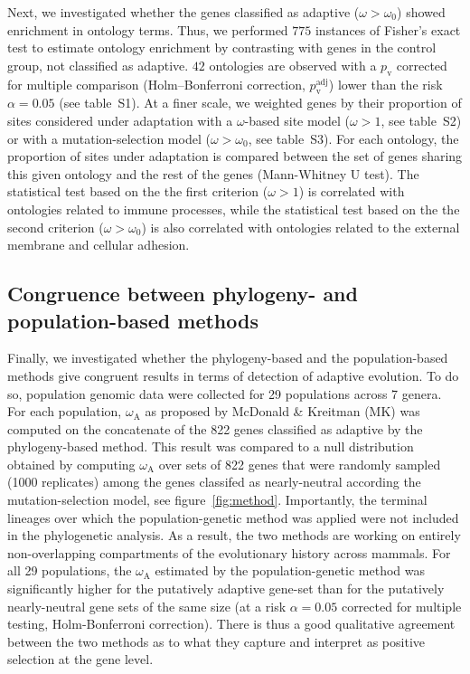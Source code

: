 \documentclass{article}
\newcommand{\rateApop}{\omega_{\mathrm{A}}}
\begin{document}
    Next, we investigated whether the genes classified as adaptive ($\omega > \omega_{0}$) showed enrichment in ontology terms.
    Thus, we performed $775$ instances of Fisher's exact test to estimate ontology enrichment by contrasting with genes in the control group, not classified as adaptive.
    $42$ ontologies are observed with a $p_{\mathrm{v}}$ corrected for multiple comparison (Holm–Bonferroni correction, $p_{\mathrm{v}}^{\mathrm{adj}}$) lower than the risk $\alpha=0.05$ (see table~S1).
    At a finer scale, we weighted genes by their proportion of sites considered under adaptation with a $\omega$-based site model ($\omega > 1$, see table~S2) or with a mutation-selection model ($\omega > \omega_{0}$, see table~S3).
    For each ontology, the proportion of sites under adaptation is compared between the set of genes sharing this given ontology and the rest of the genes (Mann-Whitney U test).
    The statistical test based on the the first criterion ($\omega>1$) is correlated with ontologies related to immune processes, while the statistical test based on the the second criterion ($\omega > \omega_{0}$) is also correlated with ontologies related to the external membrane and cellular adhesion.

    \subsection*{Congruence between phylogeny- and population-based methods}

    Finally, we investigated whether the phylogeny-based and the population-based methods give congruent results in terms of detection of adaptive evolution.
    To do so, population genomic data were collected for 29 populations across 7 genera.
    For each population, $\rateApop$ as proposed by McDonald \& Kreitman (MK)\cite{mcdonald_adaptative_1991} was computed on the concatenate of the 822 genes classified as adaptive by the phylogeny-based method.
    This result was compared to a null distribution obtained by computing $\rateApop$ over sets of 822 genes that were randomly sampled (1000 replicates) among the genes classifed as nearly-neutral according the mutation-selection model, see figure~\ref{fig:method}.
    Importantly, the terminal lineages over which the population-genetic method was applied were not included in the phylogenetic analysis.
    As a result, the two methods are working on entirely non-overlapping compartments of the evolutionary history across mammals.
    For all 29 populations, the $\rateApop$ estimated by the population-genetic method was significantly higher for the putatively adaptive gene-set than for the putatively nearly-neutral gene sets of the same size (at a risk $\alpha=0.05$ corrected for multiple testing, Holm-Bonferroni correction).
    There is thus a good qualitative agreement between the two methods as to what they capture and interpret as positive selection at the gene level.
\end{document}
